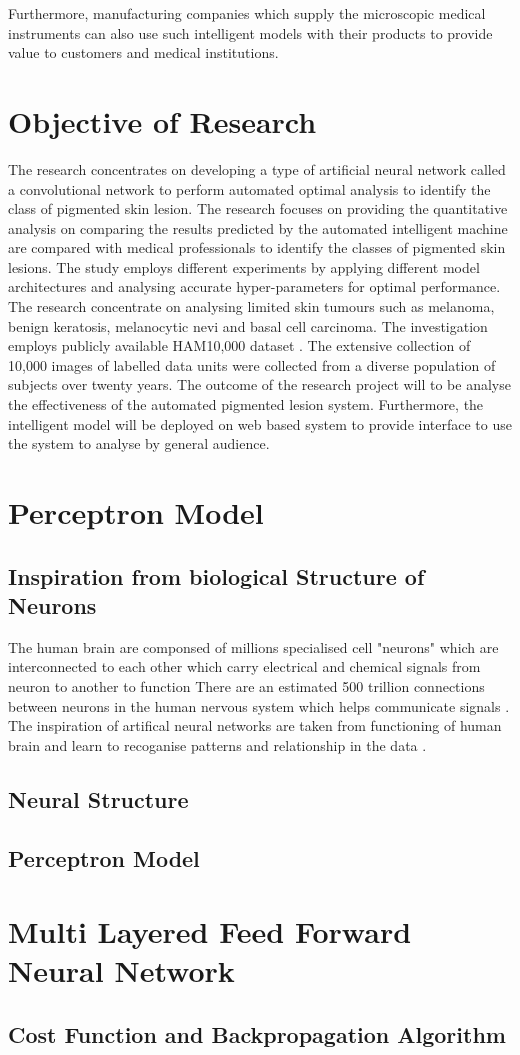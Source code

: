 Furthermore, manufacturing companies which supply the microscopic medical instruments can also use such intelligent models with their products to provide value to customers and medical institutions.

\section{Objective of Research}
The research concentrates on developing a type of artificial neural network called a convolutional network to perform automated optimal analysis to identify the class of pigmented skin lesion. 
The research focuses on providing the quantitative analysis on comparing the results predicted by the automated intelligent machine are compared with medical professionals to identify the classes of pigmented skin lesions. The study employs different experiments by applying different model architectures and analysing accurate hyper-parameters for optimal performance. 
The research concentrate on analysing limited skin tumours such as melanoma, 
benign keratosis, melanocytic nevi and basal cell carcinoma. 
The investigation employs publicly available HAM10,000 dataset \citep*{DVN/DBW86T_2018}. 
The extensive collection of 10,000 images of labelled data units were collected from a diverse population of subjects over twenty years.
The outcome of the research project will to be analyse the effectiveness of the automated pigmented 
lesion system. Furthermore, the intelligent model will be deployed on web based system to provide 
interface to use the system to analyse by general audience.
\pagebreak
\pagebreak

\section{Perceptron Model}
\subsection{Inspiration from biological Structure of Neurons}
The human brain are componsed of millions specialised cell "neurons" which are interconnected to each other which carry electrical and chemical signals from neuron to another to function
There are an estimated 500 trillion connections between neurons in the human nervous system which helps communicate signals \citep*{patterson2017deep}.
The inspiration of artifical neural networks are taken from functioning of human brain and learn to recoganise patterns and relationship in the data \citep*{AGATONOVICKUSTRIN2000717}. 
\subsection{Neural Structure}
 
\subsection{Perceptron Model}

\pagebreak
\section{Multi Layered Feed Forward Neural Network}

\pagebreak
\subsection{Cost Function and Backpropagation Algorithm}
